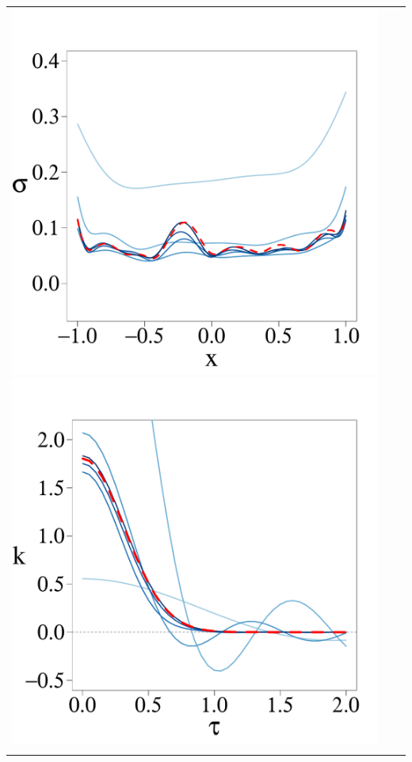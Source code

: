 \documentclass[8pt]{beamer} %
\begin{document}
\begin{frame}
\begin{itemize}
\begin{adjustwidth}{-4.3em}{-3em}
\begin{tabular}{ c c c }
\includegraphics[scale=0.17, trim = 0mm 4mm 0mm 14mm, clip]{ch5_fig3_Sigma_part6.pdf}
\includegraphics[scale=0.17, trim = 0mm 4mm 5mm 14mm, clip]{ch5_fig3_Cov_part6.pdf} &\\
\arrayrulecolor{darkgray}\hline
\end{tabular}
\end{adjustwidth}
\end{itemize}
\end{frame}
\end{document}
